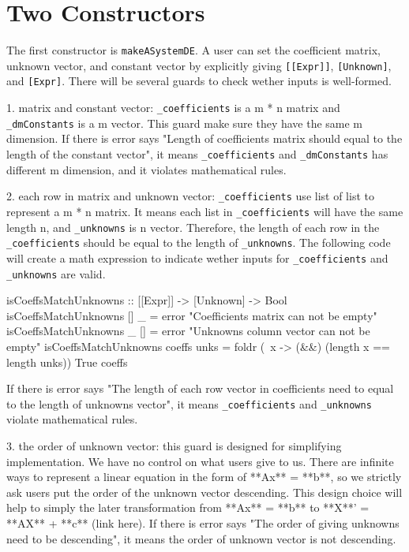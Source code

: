 \section{Two Constructors}
The first constructor is \verb|makeASystemDE|. A user can set the coefficient matrix, unknown vector, and constant vector by explicitly giving \verb|[[Expr]]|, \verb|[Unknown]|, and \verb|[Expr]|. There will be several guards to check wether inputs is well-formed.

1. matrix and constant vector: \verb|_coefficients| is a m * n matrix and \verb|_dmConstants| is a m vector. This guard make sure they have the same m dimension. If there is error says "Length of coefficients matrix should equal to the length of the constant vector", it means \verb|_coefficients| and \verb|_dmConstants| has different m dimension, and it violates mathematical rules.

2. each row in matrix and unknown vector: \verb|_coefficients| use list of list to represent a m * n matrix. It means each list in \verb|_coefficients| will have the same length n, and \verb|_unknowns| is n vector. Therefore, the length of each row in the \verb|_coefficients| should be equal to the length of \verb|_unknowns|. The following code will create a math expression to indicate wether inputs for \verb|_coefficients| and \verb|_unknowns| are valid.

\begin{haskell1}
isCoeffsMatchUnknowns :: [[Expr]] -> [Unknown] -> Bool
isCoeffsMatchUnknowns [] _ = error "Coefficients matrix can not be empty"
isCoeffsMatchUnknowns _ [] = error "Unknowns column vector can not be empty"
isCoeffsMatchUnknowns coeffs unks = foldr (\ x -> (&&) (length x == length unks)) True coeffs
\end{haskell1}

If there is error says "The length of each row vector in coefficients need to equal to the length of unknowns vector", it means \verb|_coefficients| and \verb|_unknowns| violate mathematical rules.

3. the order of unknown vector: this guard is designed for simplifying implementation. We have no control on what users give to us. There are infinite ways to represent a linear equation in the form of **Ax** = **b**, so we strictly ask users put the order of the unknown vector descending. This design choice will help to simply the later transformation from **Ax** = **b** to **X**' = **AX** + **c** (link here). If there is error says "The order of giving unknowns need to be descending", it means the order of unknown vector is not descending.

